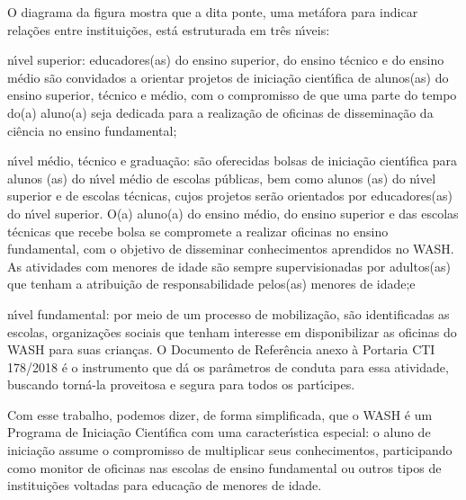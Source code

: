 \documentclass[
12pt,		%
openright,	%
twoside,  %
a4paper,			%
chapter=TITLE,		%
english,			%
french,				%
spanish,			%
brazil				%
]{USPSC-classe/USPSC}
\begin{document}
O diagrama da figura mostra que a dita \textquotedbl ponte\textquotedbl , uma met\'afora para indicar rela\c{c}\~oes entre institui\c{c}\~oes, est\'a estruturada em tr\^es n\'{\i}veis:










\begin{alineas}
\item n\'{\i}vel superior: educadores(as) do ensino superior, do ensino t\'ecnico e do ensino m\'edio s\~ao convidados a orientar projetos de inicia\c{c}\~ao cient\'{\i}fica de alunos(as) do ensino superior, t\'ecnico e m\'edio, com o compromisso de que uma parte do tempo do(a) aluno(a) seja dedicada para a realiza\c{c}\~ao de oficinas de dissemina\c{c}\~ao da ci\^encia no ensino fundamental;
\item n\'{\i}vel m\'edio, t\'ecnico e gradua\c{c}\~ao: s\~ao oferecidas bolsas de inicia\c{c}\~ao cient\'{\i}fica para alunos (as) do n\'{\i}vel m\'edio de escolas p\'ublicas, bem como alunos (as) do n\'{\i}vel superior e de escolas t\'ecnicas, cujos projetos ser\~ao orientados por educadores(as) do n\'{\i}vel superior. O(a) aluno(a) do ensino m\'edio, do ensino superior e das escolas t\'ecnicas que recebe bolsa se compromete a realizar oficinas no ensino fundamental, com o objetivo de disseminar conhecimentos aprendidos no WASH. As atividades com menores de idade s\~ao sempre supervisionadas por adultos(as) que tenham a  atribui\c{c}\~ao de responsabilidade pelos(as) menores de idade;e
\item n\'{\i}vel fundamental: por meio de um processo de mobiliza\c{c}\~ao, s\~ao identificadas as escolas, organiza\c{c}\~oes sociais que tenham interesse em disponibilizar as oficinas do WASH para suas crian\c{c}as. O Documento de Refer\^encia anexo \`a Portaria CTI 178/2018 \'e o instrumento que d\'a os par\^ametros de conduta para essa atividade, buscando torn\'a-la proveitosa e segura para todos os part\'{\i}cipes.

\end{alineas}

Com esse trabalho, podemos dizer, de forma simplificada, que o WASH \'e um Programa de Inicia\c{c}\~ao Cient\'{\i}fica com uma caracter\'{\i}stica especial: o aluno de inicia\c{c}\~ao assume o compromisso de multiplicar seus conhecimentos, participando como monitor de oficinas nas escolas de ensino fundamental ou outros tipos de institui\c{c}\~oes voltadas para educa\c{c}\~ao de menores de idade.
\end{document}
